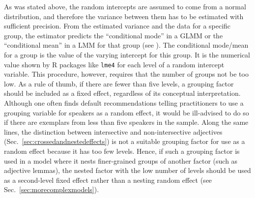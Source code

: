 As was stated above, the random intercepts are assumed to come from a normal distribution, and therefore the variance between them has to be estimated with sufficient precision.
From the estimated variance and the data for a specific group, the estimator predicts the ``conditional mode'' in a GLMM or the ``conditional mean'' in a LMM for that group (see \citealt[Ch.~1]{Bates2010}).
The conditional mode\slash mean for a group is the value of the varying intercept for this group.
It is the numerical value shown by R packages like \texttt{lme4} for each level of a random intercept variable.
This procedure, however, requires that the number of groups not be too low.
As a rule of thumb, if there are fewer than five levels, a grouping factor should be included as a fixed effect, regardless of its conceptual interpretation.
Although one often finds default recommendations telling practitioners to use a grouping variable for speakers as a random effect, it would be ill-advised to do so if there are exemplars from less than five speakers in the sample.
Along the same lines, the distinction between intersective and non-intersective adjectives (Sec.~\ref{sec:crossedandnestedeffects}) is not a suitable grouping factor for use as a random effect because it has too few levels.
Hence, if such a grouping factor is used in a model where it nests finer-grained groups of another factor (such as adjective lemmas), the nested factor with the low number of levels should be used as a second-level fixed effect rather than a nesting random effect (see Sec.~\ref{sec:morecomplexmodels}).

